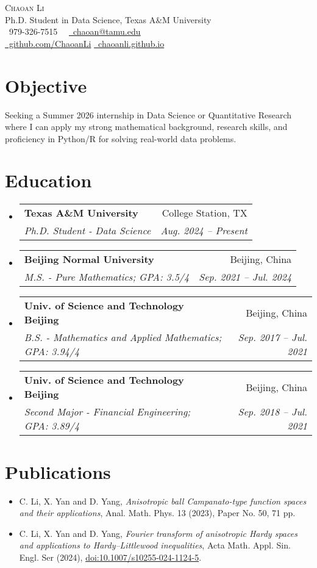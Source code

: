 \documentclass[a4paper,11pt]{article}
\makeatletter
\newcommand{\resumeSubheading}[4]{
  \vspace{-1pt}\item
    \begin{tabular*}{0.97\textwidth}{l@{\extracolsep{\fill}}r}
      \textbf{#1} & #2 \\
      \textit{#3} & \textit{#4} \\
    \end{tabular*}\vspace{-5pt}
}
\newcommand{\resumeSubHeadingListStart}{\begin{itemize}[leftmargin=*]}
\newcommand{\resumeSubHeadingListEnd}{\end{itemize}}
\makeatother
\begin{document}
\begin{center}
  {\Huge \scshape Chaoan Li} \\ \vspace{1pt}
  Ph.D. Student in Data Science, Texas A\&M University \\ \vspace{1pt}
  \small \faPhone\ 979-326-7515 \ \ \href{mailto:chaoan@tamu.edu}{\faEnvelope\ \underline{chaoan@tamu.edu}} \\
  \href{https://github.com/ChaoanLi}{\faGithub\ github.com/ChaoanLi} \quad 
  \href{https://chaoanli.github.io}{\faGlobe\ chaoanli.github.io}
  \vspace{-4pt}
\end{center}

\section*{Objective}
Seeking a Summer 2026 internship in Data Science or Quantitative Research where I can apply my strong mathematical background, research skills, and proficiency in Python/R for solving real-world data problems.

\section*{Education}
\resumeSubHeadingListStart
\resumeSubheading{Texas A\&M University}{College Station, TX}{Ph.D. Student - Data Science}{Aug. 2024 -- Present}
\resumeSubheading{Beijing Normal University}{Beijing, China}{M.S. - Pure Mathematics; GPA: 3.5/4}{Sep. 2021 -- Jul. 2024}
\resumeSubheading{Univ. of Science and Technology Beijing}{Beijing, China}{B.S. - Mathematics and Applied Mathematics; GPA: 3.94/4}{Sep. 2017 -- Jul. 2021}
\resumeSubheading{Univ. of Science and Technology Beijing}{Beijing, China}{Second Major - Financial Engineering; GPA: 3.89/4}{Sep. 2018 -- Jul. 2021}
\resumeSubHeadingListEnd

\section*{Publications}
\begin{itemize}
  \item C. Li, X. Yan and D. Yang, \textit{Anisotropic ball Campanato-type function spaces and their applications}, Anal. Math. Phys. 13 (2023), Paper No. 50, 71 pp.
  \item C. Li, X. Yan and D. Yang, \textit{Fourier transform of anisotropic Hardy spaces and applications to Hardy--Littlewood inequalities}, Acta Math. Appl. Sin. Engl. Ser (2024), \href{https://doi.org/10.1007/s10255-024-1124-5}{doi:10.1007/s10255-024-1124-5}.
\end{itemize}
\end{document}
